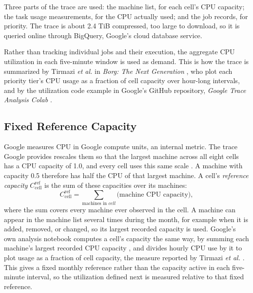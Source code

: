 \documentclass{UNCC-thesis}
\begin{document}
Three parts of the trace are used: the machine list, for each cell's CPU
capacity; the task usage measurements, for the CPU actually used; and the job
records, for priority. The trace is about 2.4 TiB compressed, too large to
download, so it is queried online through BigQuery, Google's cloud database
service.

Rather than tracking individual jobs and their execution, the aggregate CPU
utilization in each five-minute window is used as demand. This is how the
trace is summarized by Tirmazi \emph{et al.} in \emph{Borg: The Next
Generation} \cite{tirmazi2020borg}, who plot each priority tier's CPU usage as
a fraction of cell capacity over hour-long intervals, and by the utilization
code example in Google's GitHub repository, \emph{Google Trace Analysis Colab}
\cite{googleClusterAnalysisColab}.

\subsection{Fixed Reference Capacity}
\label{subsec:clusterdata-capacity}

Google measures CPU in Google compute units, an internal metric. The trace Google provides rescales them so that the largest
machine across all eight cells has a CPU capacity of 1.0, and every cell uses
this same scale \cite{wilkes2020clusterdata2019}. A machine with capacity 0.5
therefore has half the CPU of that largest machine. A cell's
\emph{reference capacity} \(C^{\mathrm{ref}}_{\mathrm{cell}}\) is the sum of these
capacities over its machines:
\begin{equation}
  C^{\mathrm{ref}}_{\mathrm{cell}}
  =
  \sum_{\text{machines in } cell}
  \bigl(\text{machine CPU capacity}\bigr),
  \label{eq:reference-capacity}
\end{equation}
where the sum covers every machine ever observed in the cell. A machine can appear in the
machine list several times during the month, for example when it is added,
removed, or changed, so its largest recorded capacity is used. Google's own
analysis notebook computes a cell's capacity the same way, by summing each
machine's largest recorded CPU capacity \cite{googleClusterAnalysisColab},
and divides hourly CPU use by it to plot usage as a fraction of cell
capacity, the measure reported by Tirmazi \emph{et al.} \cite{tirmazi2020borg}.
This gives a fixed monthly reference rather than the capacity active in each five-minute
interval, so the utilization defined next is measured relative to that fixed
reference.
\end{document}
